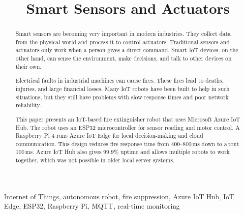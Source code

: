 \documentclass[conference]{IEEEtran}
\begin{document}
\title{Smart Sensors and Actuators}

\author{
}

\maketitle

\begin{abstract}

Smart sensors are becoming very important in modern industries. They collect data from the physical world and process it to control actuators. Traditional sensors and actuators only work when a person gives a direct command. Smart IoT devices, on the other hand, can sense the environment, make decisions, and talk to other devices on their own.

Electrical faults in industrial machines can cause fires. These fires lead to deaths, injuries, and large financial losses. Many IoT robots have been built to help in such situations, but they still have problems with slow response times and poor network reliability.

This paper presents an IoT-based fire extinguisher robot that uses Microsoft Azure IoT Hub. The robot uses an ESP32 microcontroller for sensor reading and motor control. A Raspberry Pi 4 runs Azure IoT Edge for local decision-making and cloud communication. This design reduces fire response time from 400--800\,ms down to about 100\,ms. Azure IoT Hub also gives 99.9\% uptime and allows multiple robots to work together, which was not possible in older local server systems.

\end{abstract}

\begin{IEEEkeywords}
Internet of Things, autonomous robot, fire suppression, Azure IoT Hub,
IoT Edge, ESP32, Raspberry Pi, MQTT, real-time monitoring
\end{IEEEkeywords}

\end{document}
